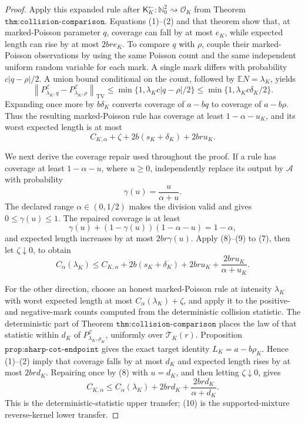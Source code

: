 \documentclass{article}
\begin{document}
\begin{proof}
Apply this expanded rule after
\(\mathsf K_K^{\leftarrow}:\mathbb N_0^2\rightsquigarrow\mathcal O_K\)
from Theorem \(\texttt{thm:collision-comparison}\).  Equations (1)--(2)
and that theorem show that, at marked-Poisson parameter \(q\), coverage
can fall by at most \(e_K\), while expected length can rise by at most
\(2br e_K\).  To compare \(q\) with \(\rho\), couple their
marked-Poisson observations by using the same Poisson count and the same
independent uniform random variable for each mark.  A single mark differs
with probability \(c|q-\rho|/2\).  A union bound conditional on the count,
followed by \(\mathbb EN=\lambda_K\), yields
\[
 \left\lVert P^{\mathcal E}_{\lambda_K,q}
 -P^{\mathcal E}_{\lambda_K,\rho}\right\rVert_{\mathrm{TV}}
 \leq\min\{1,\lambda_Kc|q-\rho|/2\}
 \leq\min\{1,\lambda_Kc\delta_K/2\}.
 \tag{6}
\]
Expanding once more by \(b\delta_K\) converts coverage of \(a-bq\)
to coverage of \(a-b\rho\).  Thus the resulting marked-Poisson rule has
coverage at least \(1-\alpha-u_K\), and its worst expected length is at
most
\[
 C_{K,\alpha}+\zeta+2b(s_K+\delta_K)+2br u_K.
 \tag{7}
\]

We next derive the coverage repair used throughout the proof.  If a rule
has coverage at least \(1-\alpha-u\), where \(u\geq0\), independently
replace its output by \(\mathcal A\) with probability
\[
 \gamma(u)=\frac{u}{\alpha+u}.
 \tag{8}
\]
The declared range \(\alpha\in(0,1/2)\) makes the division valid and gives
\(0\leq\gamma(u)\leq1\).  The repaired coverage is at least
\[
 \gamma(u)+(1-\gamma(u))(1-\alpha-u)=1-\alpha,
 \tag{9}
\]
and expected length increases by at most \(2br\gamma(u)\).  Apply
(8)--(9) to (7), then let \(\zeta\downarrow0\), to obtain
\[
 C_\alpha(\lambda_K)
 \leq C_{K,\alpha}+2b(s_K+\delta_K)+2br u_K
 +\frac{2br u_K}{\alpha+u_K}.
 \tag{10}
\]

For the other direction, choose an honest marked-Poisson rule at intensity
\(\lambda_K\) with worst expected length at most
\(C_\alpha(\lambda_K)+\zeta\), and apply it to the positive- and
negative-mark counts computed from the deterministic collision statistic.
The deterministic part of Theorem \(\texttt{thm:collision-comparison}\)
places the law of that statistic within \(d_K\) of
\(P^{\mathcal E}_{\lambda_K,\rho_K}\), uniformly over
\(\mathcal T_K(r)\).  Proposition
\(\texttt{prop:sharp-cot-endpoint}\) gives the exact target identity
\(L_K=a-b\rho_K\).  Hence (1)--(2) imply that coverage falls by at most
\(d_K\) and expected length rises by at most \(2brd_K\).  Repairing once
by (8) with \(u=d_K\), and then letting \(\zeta\downarrow0\), gives
\[
 C_{K,\alpha}
 \leq C_\alpha(\lambda_K)+2brd_K
 +\frac{2brd_K}{\alpha+d_K}.
 \tag{11}
\]
This is the deterministic-statistic upper transfer; (10) is the
supported-mixture reverse-kernel lower transfer.


\end{proof}
\end{document}
